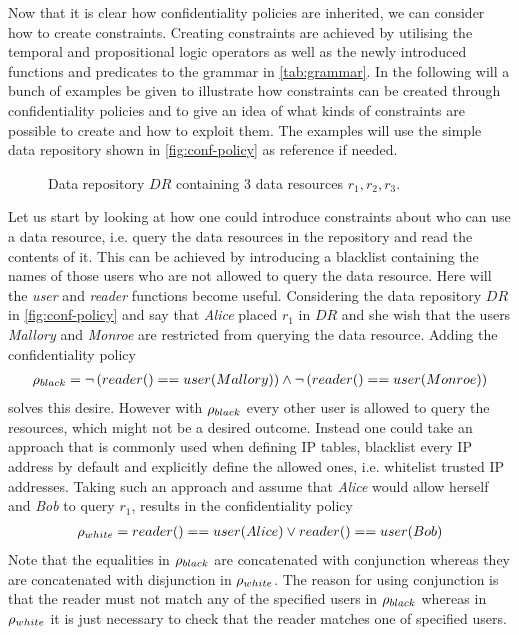 Now that it is clear how confidentiality policies are inherited, we can consider how to create constraints. Creating constraints are achieved by utilising the temporal and propositional logic operators as well as the newly introduced functions and predicates to the grammar in \autoref{tab:grammar}. In the following will a bunch of examples be given to illustrate how constraints can be created through confidentiality policies and to give an idea of what kinds of constraints are possible to create and how to exploit them. The examples will use the simple data repository shown in \autoref{fig:conf-policy} as reference if needed.

\begin{figure}[!ht]
    \begin{center}
        
        \caption{Data repository $DR$ containing 3 data resources $r_1, r_2, r_3$.}
        \label{fig:conf-policy}
    \end{center}
\end{figure}

\begin{example}\label{ex:conf-reader-constraints}
Let us start by looking at how one could introduce constraints about who can use a data resource, i.e. query the data resources in the repository and read the contents of it. This can be achieved by introducing a blacklist containing the names of those users who are not allowed to query the data resource. Here will the \emph{user} and \emph{reader} functions become useful. Considering the data repository $DR$ in \autoref{fig:conf-policy} and say that \emph{Alice} placed $r_1$ in $DR$ and she wish that the users \emph{Mallory} and \emph{Monroe} are restricted from querying the data resource. Adding the confidentiality policy 
\begin{align*}
    \rho_{black} = \lnot \left( reader() == user(Mallory) \right) \land \lnot \left( reader() == user(Monroe) \right)
\end{align*}
solves this desire. However with $\rho_{black}$ every other user is allowed to query the resources, which might not be a desired outcome. Instead one could take an approach that is commonly used when defining IP tables, blacklist every IP address by default and explicitly define the allowed ones, i.e. whitelist trusted IP addresses. Taking such an approach and assume that \emph{Alice} would allow herself and \emph{Bob} to query $r_1$, results in the confidentiality policy
\begin{align*}
    \rho_{white} = reader() == user(Alice) \lor reader() == user(Bob)
\end{align*}
Note that the equalities in $\rho_{black}$ are concatenated with conjunction whereas they are concatenated with disjunction in $\rho_{white}$. The reason for using conjunction is that the reader must not match any of the specified users in $\rho_{black}$ whereas in $\rho_{white}$ it is just necessary to check that the reader matches one of specified users.
\end{example}

